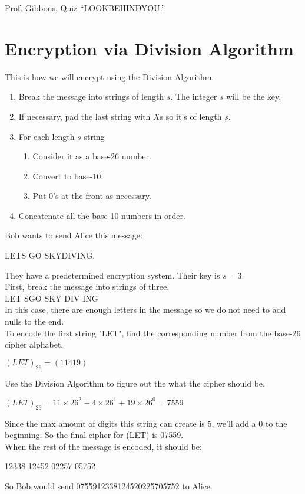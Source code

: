 \begin{chapquote}{Prof. Gibbons, Quiz}
``LOOKBEHINDYOU.''
\end{chapquote}




\section{Encryption via Division Algorithm}
This is how we will encrypt using the Division Algorithm.

\begin{enumerate}
\item Break the message into strings of length $s$. The integer $s$ will be the key.
\item If necessary, pad the last string with $X$s so it's of length $s$.
\item For each length $s$ string
\begin{enumerate}
\item Consider it as a base-26 number.
\item Convert to base-10.
\item Put 0's at the front as necessary.
\end{enumerate}
\item Concatenate all the base-10 numbers in order.
\end{enumerate}

\begin{example} Bob wants to send Alice this message:

{\centering LETS GO SKYDIVING.\\}

They have a predetermined encryption system. Their key is $s=3$.\\
First, break the message into strings of three.\\
{\centering LET SGO SKY DIV ING\\}
In this case, there are enough letters in the message so we do not need to add nulls to the end.\\
To encode the first string "LET", find the corresponding number from the base-26 cipher alphabet.

{\centering $(L E T)_{26} = (11 4 19)$\\}

Use the Division Algorithm to figure out the what the cipher should be.

{\centering $ (L E T)_{26} = 11 \times 26^{2} + 4 \times 26^{1} + 19 \times 26^{0} = 7559$\\}

Since the max amount of digits this string can create is 5, we'll add a 0 to the beginning. So the final cipher for (LET) is 07559.\\

When the rest of the message is encoded, it should be:\

{ 12338 12452 02257 05752\\}

So Bob would send 0755912338124520225705752 to Alice.

\end{example}

